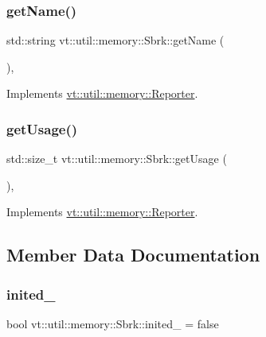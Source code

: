 \subsubsection{\texorpdfstring{get\+Name()}{getName()}}
{\footnotesize\ttfamily std\+::string vt\+::util\+::memory\+::\+Sbrk\+::get\+Name (\begin{DoxyParamCaption}{ }\end{DoxyParamCaption})\hspace{0.3cm}{\ttfamily [override]}, {\ttfamily [virtual]}}



Implements \hyperlink{structvt_1_1util_1_1memory_1_1_reporter_a83fc36e9cff3ce2deedf1d4546694713}{vt\+::util\+::memory\+::\+Reporter}.

\mbox{\label{structvt_1_1util_1_1memory_1_1_sbrk_af4df47e41f60e7f2da7a6b47c8b4a046}} 
\subsubsection{\texorpdfstring{get\+Usage()}{getUsage()}}
{\footnotesize\ttfamily std\+::size\+\_\+t vt\+::util\+::memory\+::\+Sbrk\+::get\+Usage (\begin{DoxyParamCaption}{ }\end{DoxyParamCaption})\hspace{0.3cm}{\ttfamily [override]}, {\ttfamily [virtual]}}



Implements \hyperlink{structvt_1_1util_1_1memory_1_1_reporter_a372574f51fdb68077cd3d227ee373de5}{vt\+::util\+::memory\+::\+Reporter}.



\subsection{Member Data Documentation}
\mbox{\label{structvt_1_1util_1_1memory_1_1_sbrk_a094b373315eb32e9d570dbff59d4a0bb}} 
\subsubsection{\texorpdfstring{inited\+\_\+}{inited\_}}
{\footnotesize\ttfamily bool vt\+::util\+::memory\+::\+Sbrk\+::inited\+\_\+ = false\hspace{0.3cm}{\ttfamily [private]}}

